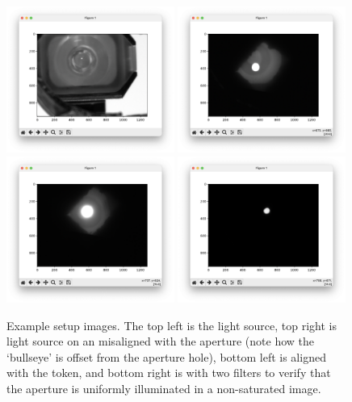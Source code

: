 \documentclass[11pt]{article}
\begin{document}
\begin{figure}[h]
    \centering
    \includegraphics[width=0.49\textwidth]{doc/source1.png}
    \includegraphics[width=0.49\textwidth]{doc/source2.png}
    \includegraphics[width=0.49\textwidth]{doc/source3.png}
    \includegraphics[width=0.49\textwidth]{doc/source4.png}
    \caption{Example setup images. The top left is the light source, top right is light source on an misaligned with the aperture (note how the `bullseye' is offset from the aperture hole), bottom left is aligned with the token, and bottom right is with two filters to verify that the aperture is uniformly illuminated in a non-saturated image.}
    \label{fig:img_setup}
\end{figure}
\end{document}
